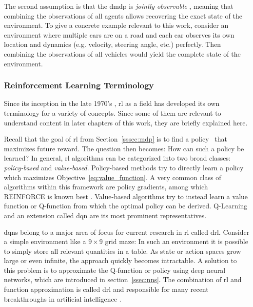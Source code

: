 The second assumption is that the \gls{dmdp} is \emph{jointly observable} \cite{oliehoekConciseIntroductionDecentralized2016}, meaning that combining the observations of all agents allows recovering the exact state of the environment. To give a concrete example relevant to this work, consider an environment where multiple cars are on a road and each car observes its own location and dynamics (e.g. velocity, steering angle, etc.) perfectly. Then combining the observations of all vehicles would yield the complete state of the environment.

\subsubsection{Reinforcement Learning Terminology}\label{sssec:rl_term}
Since its inception in the late 1970's \cite{suttonReinforcementLearningIntroduction2018}, \gls{rl} as a field has developed its own terminology for a variety of concepts. Since some of them are relevant to understand content in later chapters of this work, they are briefly explained here.

Recall that the goal of \gls{rl} from Section~\ref{sssec:mdp} is to find a policy \piplain\ that maximizes future reward. The question then becomes: How can such a policy be learned? In general, \gls{rl} algorithms can be categorized into two broad classes: \emph{policy-based} and \emph{value-based}. Policy-based methods try to directly learn a policy which maximizes Objective~\ref{eq:value_function}. A very common class of algorithms within this framework are policy gradients, among which REINFORCE is known best \cite{williamsSimpleStatisticalGradientfollowing}. Value-based algorithms try to instead learn a value function or Q-function from which the optimal policy can be derived. Q-Learning and an extension called \gls{dqn} \cite{mnihHumanlevelControlDeep2015} are its most prominent representatives.

\glspl{dqn} belong to a major area of focus for current research in \gls{rl} called \gls{drl}. Consider a simple environment like a $9 \times 9$ grid maze: In such an environment it is possible to simply store all relevant quantities in a table. As state or action spaces grow large or even infinite, the approach quickly becomes intractable. A solution to this problem is to approximate the Q-function or policy using deep neural networks, which are introduced in section~\ref{ssec:nns}. The combination of \gls{rl} and function approximation is called \gls{drl} and responsible for many recent breakthroughs in artificial intelligence \cite{mnihHumanlevelControlDeep2015, silverMasteringGameGo2016}.

